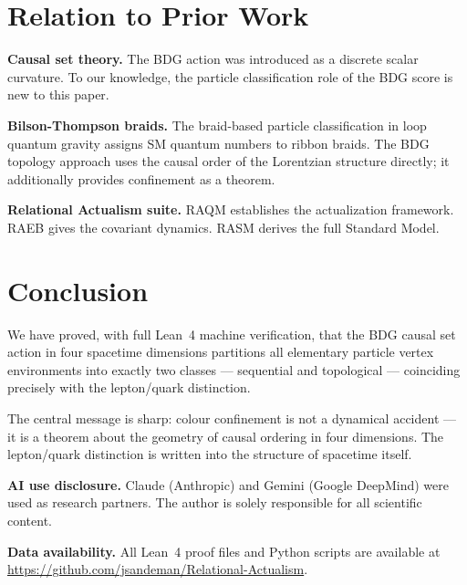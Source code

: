 \documentclass[11pt,a4paper]{article}
\begin{document}
\section{Relation to Prior Work}

\textbf{Causal set theory.}  The BDG action \citep{Benincasa2010} was introduced as a discrete
scalar curvature.  To our knowledge, the particle classification role of the BDG score is new to
this paper.

\textbf{Bilson-Thompson braids.}  The braid-based particle classification \citep{BilsonThompson2005}
in loop quantum gravity assigns SM quantum numbers to ribbon braids.  The BDG topology approach
uses the causal order of the Lorentzian structure directly; it additionally provides confinement as
a theorem.

\textbf{Relational Actualism suite.}  RAQM \citep{Sandeman2026RAQM} establishes the
actualization framework.  RAEB \citep{Sandeman2026RAEB} gives the covariant dynamics.
RASM \citep{Sandeman2026RASM} derives the full Standard Model.

\section{Conclusion}

We have proved, with full Lean~4 machine verification, that the BDG causal set action in four
spacetime dimensions partitions all elementary particle vertex environments into exactly two
classes --- sequential and topological --- coinciding precisely with the lepton/quark distinction.

The central message is sharp: colour confinement is not a dynamical accident --- it is a theorem
about the geometry of causal ordering in four dimensions.  The lepton/quark distinction is
written into the structure of spacetime itself.

\bigskip\noindent
\textbf{AI use disclosure.}  Claude (Anthropic) and Gemini (Google DeepMind) were used as
research partners.  The author is solely responsible for all scientific content.

\bigskip\noindent
\textbf{Data availability.}  All Lean~4 proof files and Python scripts are available at
\url{https://github.com/jsandeman/Relational-Actualism}.
\end{document}
